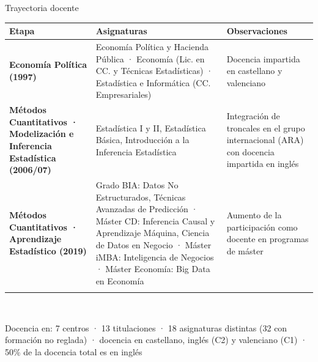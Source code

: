 \documentclass[
  8pt,
  ignorenonframetext,
  aspectratio=169,
  spanish,
]{beamer}
\newcommand{\lightrowrule}{\arrayrulecolor{black!25}\specialrule{0.4pt}{1pt}{1pt}\arrayrulecolor{black}}
\begin{document}
\begin{frame}{Trayectoria docente}
\label{trayectoria-docente}
~

\begin{longtable}[]{@{}
  >{\raggedright\arraybackslash}p{}
  >{\raggedright\arraybackslash}p{}
  >{\raggedright\arraybackslash}p{}@{}}
\toprule\noalign{}
\begin{minipage}[b]{\linewidth}\raggedright
\textbf{Etapa}
\end{minipage} & \begin{minipage}[b]{\linewidth}\raggedright
\textbf{Asignaturas}
\end{minipage} & \begin{minipage}[b]{\linewidth}\raggedright
\textbf{Observaciones}
\end{minipage} \\
\midrule\noalign{}
\endhead
\bottomrule\noalign{}
\endlastfoot
\textbf{Economía Política (1997)} & Economía Política y Hacienda Pública
· Economía (Lic. en CC. y Técnicas Estadísticas) · Estadística e
Informática (CC. Empresariales) & Docencia impartida en castellano y
valenciano \\ \lightrowrule
\textbf{Métodos Cuantitativos · Modelización e Inferencia Estadística
(2006/07)} & Estadística I y II, Estadística Básica, Introducción a la
Inferencia Estadística & Integración de troncales en el grupo
internacional (ARA) con docencia impartida en inglés \\ \lightrowrule
\textbf{Métodos Cuantitativos · Aprendizaje Estadístico (2019)} & Grado
BIA: Datos No Estructurados, Técnicas Avanzadas de Predicción · Máster
CD: Inferencia Causal y Aprendizaje Máquina, Ciencia de Datos en Negocio
· Máster iMBA: Inteligencia de Negocios · Máster Economía: Big Data en
Economía & Aumento de la participación como docente en programas de
máster \\ \lightrowrule
\end{longtable}

~

Docencia en: 7 centros · 13 titulaciones · 18 asignaturas distintas (32
con formación no reglada) · docencia en castellano, inglés (C2) y
valenciano (C1) · 50\% de la docencia total es en inglés

\end{frame}
\end{document}
